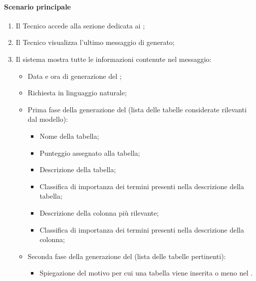 \paragraph*{Scenario principale}
\begin{enumerate}
  \item Il Tecnico accede alla sezione dedicata ai ;
  \item Il Tecnico visualizza l'ultimo messaggio di  generato;
  \item Il sistema mostra tutte le informazioni contenute nel messaggio:
    \begin{itemize}
      \item Data e ora di generazione del ;
      \item Richiesta in linguaggio naturale;
      \item Prima fase della generazione del  (lista delle tabelle considerate rilevanti dal modello):
      \begin{itemize}
        \item Nome della tabella;
        \item Punteggio assegnato alla tabella;
        \item Descrizione della tabella;
        \item Classifica di importanza dei termini presenti nella descrizione della tabella;
        \item Descrizione della colonna più rilevante;
        \item Classifica di importanza dei termini presenti nella descrizione della colonna;
      \end{itemize}
      \item Seconda fase della generazione del  (lista delle tabelle pertinenti):
      \begin{itemize}
        \item Spiegazione del motivo per cui una tabella viene inserita o meno nel .
      \end{itemize}
    \end{itemize}
\end{enumerate}